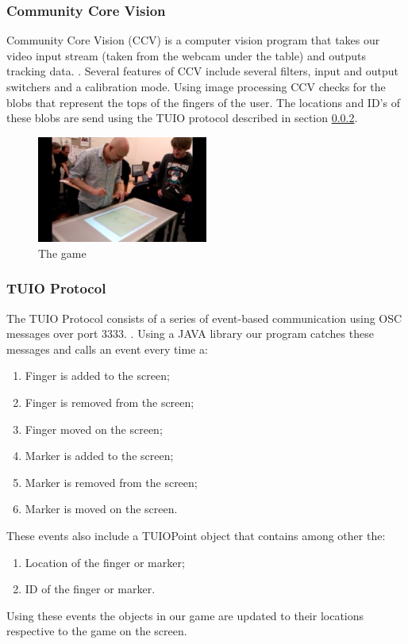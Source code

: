 \documentclass[a4paper,10pt]{report}
\begin{document}
	\subsubsection{Community Core Vision}
	\label{sec:communitycorevision}	
	Community Core Vision (CCV) is a computer vision program that takes our video input stream (taken from the webcam under the table) and outputs tracking data. \cite{ccv}.
			Several features of CCV include several filters, input and output switchers and a calibration mode. 
	Using image processing CCV checks for the blobs that represent the tops of the fingers of the user. 
	The locations and ID's of these blobs are send using the TUIO protocol described in section \ref{sec:tuioprotocol}.
	\begin{figure}[h!]
		\caption{The game}
		\centering
		\includegraphics[width=0.5\textwidth]{images/tafelgebruik}
	\end{figure}
	
	\subsubsection{TUIO Protocol}
	\label{sec:tuioprotocol}
	The TUIO Protocol consists of a series of event-based communication using OSC messages over port 3333. \cite{tuioProtocol}. 
	Using a JAVA library our program catches these messages and calls an event every time a:
	\begin{enumerate}
		\item Finger is added to the screen;
		\item Finger is removed from the screen;
		\item Finger moved on the screen;
		\item Marker is added to the screen;
		\item Marker is removed from the screen;
		\item Marker is moved on the screen.
	\end{enumerate}
	
	These events also include a TUIOPoint object that contains among other the:
	\begin{enumerate}
		\item Location of the finger or marker;
		\item ID of the finger or marker.
	\end{enumerate}
	Using these events the objects in our game are updated to their locations respective to the game on the screen. %
			
\end{document}
